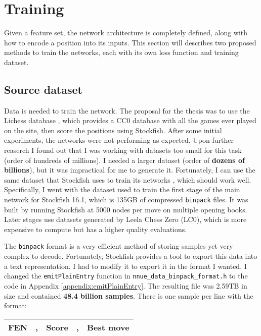 \section{Training}

Given a feature set, the network architecture is completely defined, along with how to encode a position into its inputs. This section will describes two proposed methods to train the networks, each with its own loss function and training dataset.

\subsection{Source dataset}

Data is needed to train the network. The proposal for the thesis was to use the Lichess database \cite{lichessdb}, which provides a CC0 database with all the games ever played on the site, then score the positions using Stockfish. After some initial experiments, the networks were not performing as expected. Upon further reaserch I found out that I was working with datasets too small for this task (order of hundreds of millions). I needed a larger dataset (order of \textbf{dozens of billions}), but it was impractical for me to generate it. Fortunately, I can use the same dataset that Stockfish uses to train its networks \cite{sf_nnue_dataset}, which should work well. Specifically, I went with the dataset used to train the first stage of the main network for Stockfish 16.1, which is 135GB of compressed \texttt{binpack} files. It was built by running Stockfish at 5000 nodes per move on multiple opening books. Later stages use datasets generated by Leela Chess Zero (LC0), which is more expensive to compute but has a higher quality evaluations.

The \texttt{binpack} format is a very efficient method of storing samples yet very complex to decode. Fortunately, Stockfish provides a tool to export this data into a text representation. I had to modify it to export it in the format I wanted. I changed the \texttt{emitPlainEntry} function in \texttt{nnue\_data\_binpack\_format.h} to the code in Appendix \ref{appendix:emitPlainEntry}. The resulting file was 2.59TB in size and contained \textbf{48.4 billion samples}. There is one sample per line with the format:

\begin{center}
\begin{tabular}{|cp{0.0005cm}cp{0.0005cm}c|}
\hline
\textbf{FEN\footnotemark} & , & \textbf{Score} & , & \textbf{Best move} \\
\hline
\end{tabular}
\end{center}

